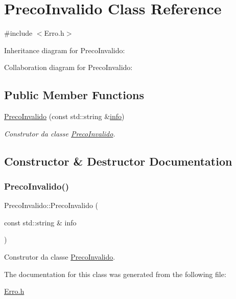 \hypertarget{class_preco_invalido}{}\section{Preco\+Invalido Class Reference}
\label{class_preco_invalido}


{\ttfamily \#include $<$Erro.\+h$>$}



Inheritance diagram for Preco\+Invalido\+:


Collaboration diagram for Preco\+Invalido\+:
\subsection*{Public Member Functions}
\begin{DoxyCompactItemize}
\item 
\mbox{\hyperlink{class_preco_invalido_a596bb49295f1cd9454797a4db70b5b77}{Preco\+Invalido}} (const std\+::string \&\mbox{\hyperlink{class_erro_a3ecaaf6f8e15a0830a648035b456cb62}{info}})
\begin{DoxyCompactList}\small\item\em Construtor da classe \mbox{\hyperlink{class_preco_invalido}{Preco\+Invalido}}. \end{DoxyCompactList}\end{DoxyCompactItemize}


\subsection{Constructor \& Destructor Documentation}
\mbox{\label{class_preco_invalido_a596bb49295f1cd9454797a4db70b5b77}} 
\subsubsection{\texorpdfstring{Preco\+Invalido()}{PrecoInvalido()}}
{\footnotesize\ttfamily Preco\+Invalido\+::\+Preco\+Invalido (\begin{DoxyParamCaption}\item[{const std\+::string \&}]{info }\end{DoxyParamCaption})\hspace{0.3cm}{\ttfamily [inline]}}



Construtor da classe \mbox{\hyperlink{class_preco_invalido}{Preco\+Invalido}}. 



The documentation for this class was generated from the following file\+:\begin{DoxyCompactItemize}
\item 
\mbox{\hyperlink{_erro_8h}{Erro.\+h}}\end{DoxyCompactItemize}
